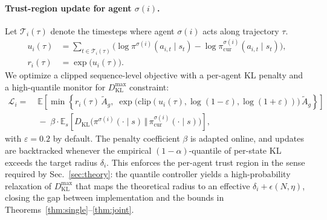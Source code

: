\documentclass[sigconf]{aamas}
\newcommand{\E}{\mathbb{E}}
\newcommand{\KL}{D_{\mathrm{KL}}}
\begin{document}
\paragraph{Trust-region update for agent $\sigma(i)$.}
Let $\mathcal{T}_i(\tau)$ denote the timesteps where agent $\sigma(i)$ acts along trajectory $\tau$. 
\begin{align}
u_i(\tau) &= \sum_{t\in\mathcal{T}_i(\tau)}\Big(\log\pi^{\sigma(i)}(a_{i,t}\!\mid s_t)-\log\pi^{\sigma(i)}_{\mathrm{cur}}(a_{i,t}\!\mid s_t)\Big), \\
r_i(\tau) &= \exp\big(u_i(\tau)\big).
\end{align}
We optimize a clipped sequence-level objective with a per-agent KL penalty and a high-quantile monitor for $\KL^{\max}$ constraint:
\begin{equation}
\begin{split}
\mathcal{L}_i = &\; \E\!\left[\min\!\left\{r_i(\tau)\,\tilde A_{g},\; \exp\!\big(\mathrm{clip}(u_i(\tau),\log(1-\varepsilon),\log(1+\varepsilon))\big)\,\tilde A_{g}\right\}\right] \\
&\; -\;\beta\cdot \E_{s}\!\left[\KL\!\big(\pi^{\sigma(i)}(\cdot\mid s)\,\Vert\,\pi^{\sigma(i)}_{\mathrm{cur}}(\cdot\mid s)\big)\right],
\end{split}
\end{equation}
with $\varepsilon=0.2$ by default. The penalty coefficient $\beta$ is adapted online, and updates are backtracked whenever the empirical $(1-\alpha)$-quantile of per-state KL exceeds the target radius $\delta_i$. This enforces the per-agent trust region in the sense required by Sec.~\ref{sec:theory}: the quantile controller yields a high-probability relaxation of $\KL^{\max}$ that maps the theoretical radius to an effective $\delta_i+\epsilon(N,\eta)$, closing the gap between implementation and the bounds in Theorems~\ref{thm:single}--\ref{thm:joint}.
\end{document}

